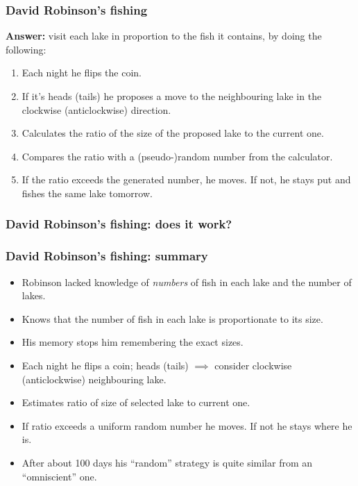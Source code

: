 \documentclass[handout]{beamer}
\begin{document}
\begin{frame}
\frametitle{David Robinson's fishing}

\textbf{Answer:} visit each lake in proportion to the fish it contains, by doing the following:
\begin{enumerate}
\item<3-> Each night he flips the coin.
\item<4-> If it's heads (tails) he proposes a move to the neighbouring lake in the clockwise (anticlockwise) direction.
\item<5-> Calculates the ratio of the size of the proposed lake to the current one.
\item<6-> Compares the ratio with a (pseudo-)random number from the calculator.
\item<7-> If the ratio exceeds the generated number, he moves. If not, he stays put and fishes the same lake tomorrow.
\end{enumerate}

\end{frame}

\begin{frame}
\frametitle{David Robinson's fishing: does it work?}

\begin{figure}[t]
\centerline{}
\end{figure}

\end{frame}

\begin{frame}
\frametitle{David Robinson's fishing: summary}

\begin{itemize}
\item<2-> Robinson lacked knowledge of \textit{numbers} of fish in each lake and the number of lakes.
\item<3-> Knows that the number of fish in each lake is proportionate to its size.
\item<4-> His memory stops him remembering the exact sizes.
\item<5-> Each night he flips a coin; heads (tails) $\implies$ consider clockwise (anticlockwise) neighbouring lake.
\item<6-> Estimates ratio of size of selected lake to current one.
\item<7-> If ratio exceeds a uniform random number he moves. If not he stays where he is.
\item<8-> After about 100 days his ``random'' strategy is quite similar from an ``omniscient'' one.
\end{itemize}

\end{frame}
\end{document}
